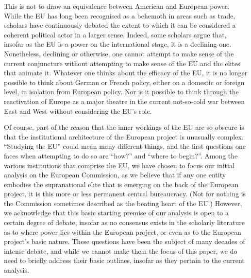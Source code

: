\documentclass[11pt,a4paper]{article}
\begin{document}
This is not to draw an equivalence between American and European power. While the EU has long been recognised as a behemoth in areas such as trade, scholars have continuously debated the extent to which it can be considered a coherent political actor in a larger sense. Indeed, some scholars argue that, insofar as the EU is a power on the international stage, it is a declining one. Nonetheless, declining or otherwise, one cannot attempt to make sense of the current conjuncture without attempting to make sense of the EU and the elites that animate it. Whatever one thinks about the efficacy of the EU, it is no longer possible to think about German or French policy, either on a domestic or foreign level, in isolation from European policy. Nor is it possible to think through the reactivation of Europe as a major theatre in the current not-so-cold war between East and West without considering the EU's role.

Of course, part of the reason that the inner workings of the EU are so obscure is that the institutional architecture of the European project is unusually complex. ``Studying the EU'' could mean many different things, and the first questions one faces when attempting to do so are ``how?'' and ``where to begin?''. Among the various institutions that comprise the EU, we have chosen to focus our initial analysis on the European Commission, as we believe that if any one entity embodies the supranational elite that is emerging on the back of the European project, it is this more or less permanent central bureaucracy. (Not for nothing is the Commission sometimes described as the beating heart of the EU.) However, we acknowledge that this basic starting premise of our analysis is open to a certain degree of debate, insofar as no consensus exists in the scholarly literature as to where power lies within the European project, or even as to the European project's basic nature. These questions have been the subject of many decades of intense debate, and while we cannot make them the focus of this paper, we do need to briefly address their basic outlines, insofar as they pertain to the current analysis.
\end{document}
